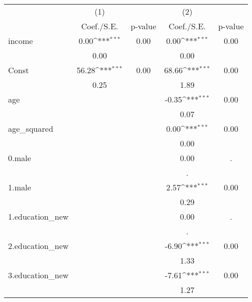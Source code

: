 {
\def\sym#1{\ifmmode^{#1}\else\(^{#1}\)\fi}
\begin{tabular}{l*{2}{cc}}
\hline\hline
            &\multicolumn{1}{c}{(1)}         &            &\multicolumn{1}{c}{(2)}         &            \\
            &  Coef./S.E.         &     p-value&  Coef./S.E.         &     p-value\\
\hline
income      &        0.00\sym{***}&        0.00&        0.00\sym{***}&        0.00\\
            &        0.00         &            &        0.00         &            \\
Const       &       56.28\sym{***}&        0.00&       68.66\sym{***}&        0.00\\
            &        0.25         &            &        1.89         &            \\
age         &                     &            &       -0.35\sym{***}&        0.00\\
            &                     &            &        0.07         &            \\
age\_squared &                     &            &        0.00\sym{***}&        0.00\\
            &                     &            &        0.00         &            \\
0.male      &                     &            &        0.00         &           .\\
            &                     &            &           .         &            \\
1.male      &                     &            &        2.57\sym{***}&        0.00\\
            &                     &            &        0.29         &            \\
1.education\_new&                     &            &        0.00         &           .\\
            &                     &            &           .         &            \\
2.education\_new&                     &            &       -6.90\sym{***}&        0.00\\
            &                     &            &        1.33         &            \\
3.education\_new&                     &            &       -7.61\sym{***}&        0.00\\
            &                     &            &        1.27         &            \\

\end{tabular}}
